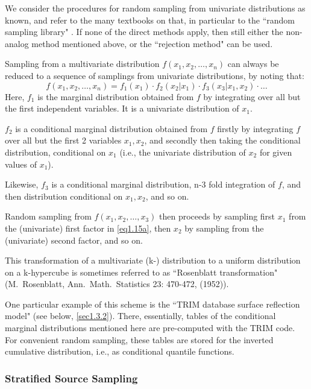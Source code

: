 \medskip

We consider the procedures for random sampling from univariate distributions as
known, and refer to the many textbooks on that, in particular to the ``random
sampling library" \cite{kn:Sampling}.
If none of the direct methods apply, then still either the non-analog method
mentioned above, or the ``rejection method" can be used.

Sampling from a multivariate distribution $f(x_1, x_2, \dots, x_n)$ can always
be reduced to a sequence of samplings from univariate distributions, by noting
that:
\begin{equation}
  \label{eq1.15a}
  f(x_1, x_2, \dots, x_n)=f_1(x_1) \cdot f_2(x_2|x_1) \cdot
  f_3(x_3|x_1,x_2) \cdot \dots
\end{equation}
Here, $f_1$ is the marginal distribution obtained from $f$ by integrating over
all but the first independent variables.
It is a univariate distribution of $x_1$.

$f_2$ is a conditional marginal distribution obtained from $f$ firstly by
integrating $f$ over all but the first 2 variables $x_1, x_2$, and secondly
then taking the conditional distribution, conditional on $x_1$ (i.e., the
univariate distribution of $x_2$ for given values of $x_1$).

Likewise, $f_3$ is a conditional marginal distribution, n-3 fold integration of
$f$, and then distribution conditional on $x_1, x_2$, and so on.

Random sampling from $f(x_1, x_2, \dots, x_3)$ then proceeds by sampling first
$x_1$ from the (univariate) first factor in \cref{eq1.15a}, then $x_2$ by
sampling from the (univariate) second factor, and so on.

This transformation of a multivariate (k-) distribution to a uniform
distribution on a k-hy\-per\-cube is sometimes referred to as ``Rosenblatt
transformation" (M.~Rosenblatt, Ann.\ Math.\ Statistics 23: 470-472, (1952)).

One particular example of this scheme is the ``TRIM database surface reflection
model" (see below, \cref{sec1.3.2}).
There, essentially, tables of the conditional marginal distributions mentioned
here are pre-computed with the TRIM code.
For convenient random sampling, these tables are stored for the inverted
cumulative distribution, i.e., as conditional quantile functions.

\subsubsection{Stratified Source Sampling}
\label{sec1.2.1b}

